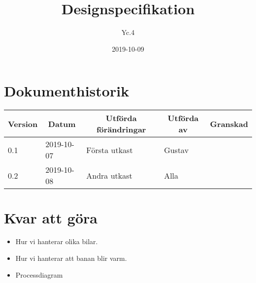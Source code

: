 \documentclass[10pt,oneside,swedish]{lips-no_customer}
\title{Designspecifikation}
\author{Yc.4}
\date{2019-10-09}
\begin{document}
\maketitle

\cleardoublepage
\makeprojectid

\cleardoublepage
\tableofcontents

\cleardoublepage
\section*{Dokumenthistorik}
\begin{tabular}{p{}|p{}|p{}|p{}|p{}} 
  \multicolumn{1}{c}{\bfseries Version} & 
  \multicolumn{1}{|c}{\bfseries Datum} & 
  \multicolumn{1}{|c}{\bfseries Utförda förändringar} & 
  \multicolumn{1}{|c}{\bfseries Utförda av} & 
  \multicolumn{1}{|c}{\bfseries Granskad}\\
  \hline
  \hline
  0.1 & 2019-10-07 & Första utkast & Gustav & \\
  0.2 & 2019-10-08 & Andra utkast & Alla & \\
  \hline
\end{tabular}

\cleardoublepage
{}\cfoot{\thepage}






\section{Kvar att göra}
\begin{itemize}
  \item Hur vi hanterar olika bilar.
  \item Hur vi hanterar att banan blir varm.
  \item Processdiagram
\end{itemize}
\end{document}
